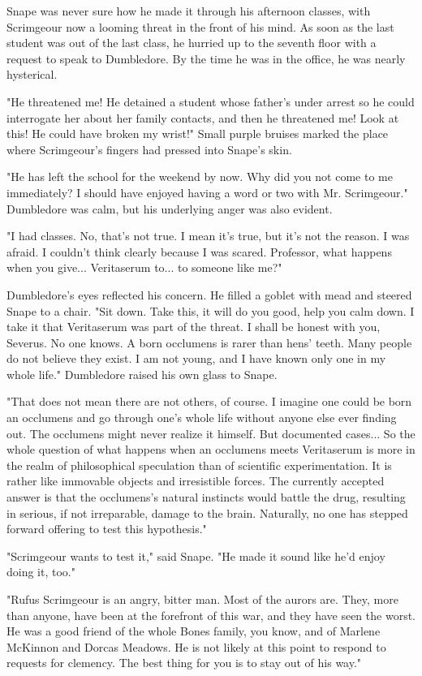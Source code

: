 Snape was never sure how he made it through his afternoon classes, with Scrimgeour now a looming threat in the front of his mind. As soon as the last student was out of the last class, he hurried up to the seventh floor with a request to speak to Dumbledore. By the time he was in the office, he was nearly hysterical.

"He threatened me! He detained a student whose father's under arrest so he could interrogate her about her family contacts, and then he threatened me! Look at this! He could have broken my wrist!" Small purple bruises marked the place where Scrimgeour's fingers had pressed into Snape's skin.

"He has left the school for the weekend by now. Why did you not come to me immediately? I should have enjoyed having a word or two with Mr. Scrimgeour." Dumbledore was calm, but his underlying anger was also evident.

"I had classes. No, that's not true. I mean it's true, but it's not the reason. I was afraid. I couldn't think clearly because I was scared. Professor, what happens when you give... Veritaserum to... to someone like me?"

Dumbledore's eyes reflected his concern. He filled a goblet with mead and steered Snape to a chair. "Sit down. Take this, it will do you good, help you calm down. I take it that Veritaserum was part of the threat. I shall be honest with you, Severus. No one knows. A born occlumens is rarer than hens' teeth. Many people do not believe they exist. I am not young, and I have known only one in my whole life." Dumbledore raised his own glass to Snape.

"That does not mean there are not others, of course. I imagine one could be born an occlumens and go through one's whole life without anyone else ever finding out. The occlumens might never realize it himself. But documented cases... So the whole question of what happens when an occlumens meets Veritaserum is more in the realm of philosophical speculation than of scientific experimentation. It is rather like immovable objects and irresistible forces. The currently accepted answer is that the occlumens's natural instincts would battle the drug, resulting in serious, if not irreparable, damage to the brain. Naturally, no one has stepped forward offering to test this hypothesis."

"Scrimgeour wants to test it," said Snape. "He made it sound like he'd enjoy doing it, too."

"Rufus Scrimgeour is an angry, bitter man. Most of the aurors are. They, more than anyone, have been at the forefront of this war, and they have seen the worst. He was a good friend of the whole Bones family, you know, and of Marlene McKinnon and Dorcas Meadows. He is not likely at this point to respond to requests for clemency. The best thing for you is to stay out of his way."

